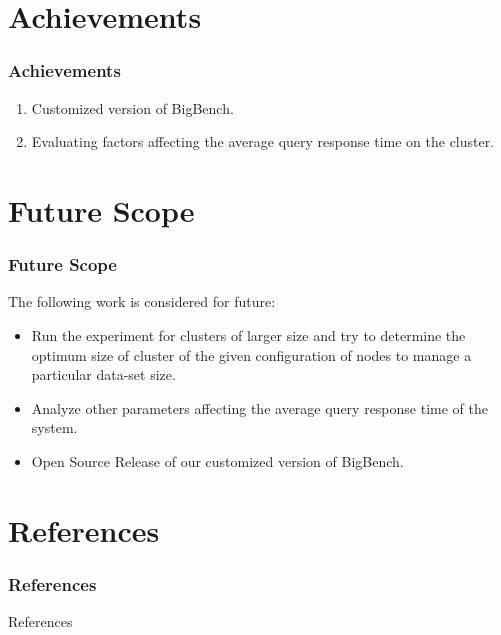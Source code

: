 \documentclass[12pt,xcolor=dvipsnames]{beamer}
\begin{document}
\section{Achievements}
\begin{frame}[t]
\frametitle{Achievements}
\begin{enumerate}
 \item Customized version of BigBench.\cite{bigbenchgit} 
 \item Evaluating factors affecting the average query response time on the cluster.
\end{enumerate}




\end{frame}




\section{Future Scope}
\begin{frame}[t]
\frametitle{Future Scope}
 The following work is considered for future:
\begin{itemize}
 \item  Run the experiment for clusters of larger size and try to determine the optimum size of cluster of the given
	configuration of nodes to manage a particular data-set size.
 \item Analyze other parameters affecting the average query response time of the system.
 \item  Open Source Release of our customized version of BigBench.\cite{bigb}
\end{itemize}
\end{frame}





















\section{References }
\frametitle{References }
\begin{frame}[allowframebreaks]{References}







\end{frame}
\end{document}
